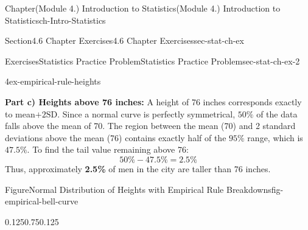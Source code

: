 \documentclass[oneside,10pt,]{book}
\newcommand{\terminology}[1]{\textbf{#1}}
\begin{document}
\begin{chapterptx}{Chapter}{(Module 4.) Introduction to Statistics}{}{(Module 4.) Introduction to Statistics}{}{}{ch-Intro-Statistics}
\begin{sectionptx}{Section}{4.6 Chapter Exercises}{}{4.6 Chapter Exercises}{}{}{sec-stat-ch-ex}
\begin{exercises-subsection-numberless}{Exercises}{Statistics Practice Problem}{}{Statistics Practice Problem}{}{}{sec-stat-ch-ex-2}
\begin{divisionexercise}{4}{}{}{ex-empirical-rule-heights}
\par
\terminology{Part c) Heights above 76 inches:} A height of 76 inches corresponds exactly to mean\(+ 2\text{SD}\). Since a normal curve is perfectly symmetrical, \(50\%\) of the data falls above the mean of 70. The region between the mean (70) and 2 standard deviations above the mean (76) contains exactly half of the \(95\%\) range, which is \(47.5\%\). To find the tail value remaining above 76:%
\begin{equation*}
50\% - 47.5\% = 2.5\%
\end{equation*}
Thus, approximately \terminology{2.5\%} of men in the city are taller than 76 inches.%
\begin{figureptx}{Figure}{Normal Distribution of Heights with Empirical Rule Breakdowns}{fig-empirical-bell-curve}{}%
\begin{image}{0.125}{0.75}{0.125}{}%
\end{image}
\end{figureptx}
\end{divisionexercise}
\end{exercises-subsection-numberless}
\end{sectionptx}
\end{chapterptx}
\end{document}

